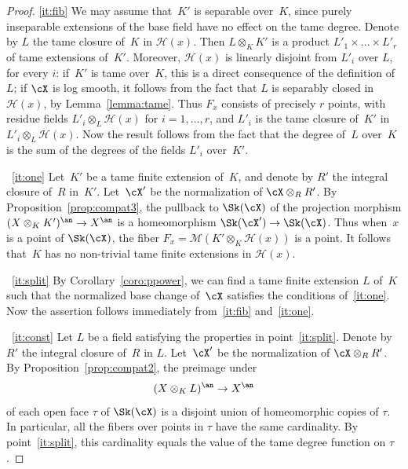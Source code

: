 \skpt
\begin{proof}
\eqref{it:fib} We may assume that~$K'$ is separable over~$K$, since purely inseparable extensions of the base field have no effect on the tame degree.
Denote by $L$ the tame closure of~$K$ in $\mathscr{H}(x)$. Then $L\otimes_K K'$ is a product $L'_1\times \ldots \times L'_r$ of tame extensions of~$K'$.
Moreover, $\mathscr{H}(x)$ is linearly disjoint from $L'_i$ over $L$, for every $i$: if~$K'$ is tame over~$K$, this is a direct consequence of the definition of $L$; if
$\cX$ is log smooth, it follows from the fact that $L$ is separably closed in $\mathscr{H}(x)$, by Lemma~\ref{lemma:tame}.
Thus $F_x$ consists of precisely $r$ points, with residue fields $L'_i\otimes_L \mathscr{H}(x)$ for $i=1,\ldots,r$, and $L'_i$ is the tame closure of~$K'$ in $L'_i\otimes_L \mathscr{H}(x)$. Now the result follows from the fact that the degree of~$L$ over~$K$ is the sum of the degrees of the fields $L'_i$ over~$K'$.

~\eqref{it:one} Let~$K'$ be a tame finite extension of~$K$, and denote by $R'$ the integral closure of~$R$ in~$K'$. Let~$\cX'$ be the normalization of $\cX\otimes_R R'$.
By Proposition~\ref{prop:compat3}, the pullback to $\Sk(\cX)$ of the projection morphism $(X\otimes_K K')^{\an}\to X^{\an}$ is a homeomorphism
$\Sk(\cX')\to \Sk(\cX)$. Thus when~$x$ is a point of $\Sk(\cX)$, the fiber $F_x=\mathcal{M}(K'\otimes_K \mathscr{H}(x))$ is a point.
It follows that~$K$ has no non-trivial tame finite extensions in $\mathscr{H}(x)$.

~\eqref{it:split}
By Corollary~\ref{coro:ppower}, we can find a tame finite extension $L$ of~$K$ such that the normalized base change of~$\cX$ satisfies the conditions of~\eqref{it:one}. Now the assertion
follows immediately from~\eqref{it:fib} and~\eqref{it:one}.

~\eqref{it:const} Let $L$ be a field satisfying the properties in point~\eqref{it:split}.
Denote by $R'$ the integral closure of~$R$ in $L$. Let~$\cX'$ be the normalization of $\cX\otimes_R R'$. By Proposition~\ref{prop:compat2}, the preimage under
\[
(X\otimes_K L)^{\an}\to X^{\an}
\]
of each open face $\tau$ of $\Sk(\cX)$ is a disjoint union of homeomorphic copies of $\tau$. In particular, all the fibers over points in $\tau$ have the same cardinality. By point~\eqref{it:split}, this cardinality equals the value of the tame degree function on $\tau$.
\end{proof}

